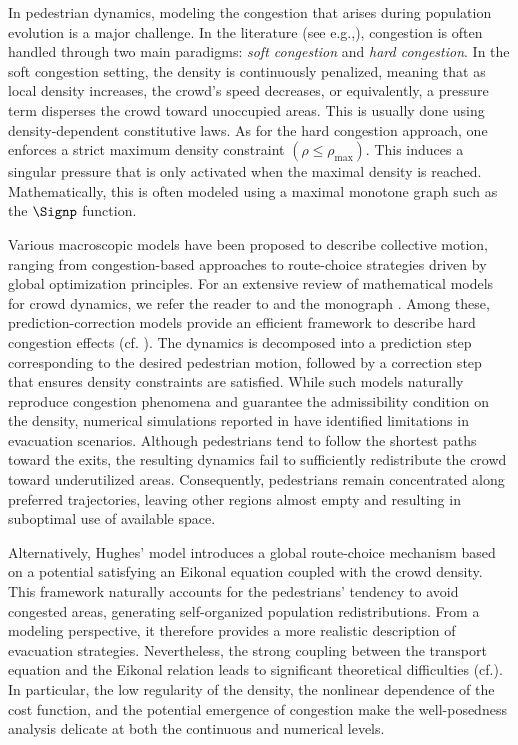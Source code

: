 \documentclass[final,reqno]{amsart}
\theoremstyle{plain}
\theoremstyle{definition}
\theoremstyle{remark}
\numberwithin{remark}{section}	%
\numberwithin{example}{section}	%
\newcommand{\cf}{cf.\xspace}	%
\newcommand{\eg}{e.g.,\xspace}	%
\begin{document}
In pedestrian dynamics, modeling the congestion that arises during population evolution is a major challenge. In the literature (see \eg \cite{Maury-EDP-Normandie}), congestion is often handled through two main paradigms: \emph{soft congestion} and \emph{hard congestion}. In the soft congestion setting, the density is continuously penalized, meaning that as local density increases, the crowd's speed decreases, or equivalently, a pressure term disperses the crowd toward unoccupied areas. This is usually done using density-dependent constitutive laws. As for the hard congestion approach, one enforces a strict maximum density constraint $(\rho \leq \rho_{\max})$. This induces a singular pressure that is only activated when the maximal density is reached. Mathematically, this is often modeled using a maximal monotone graph such as the $\Signp$ function.

Various macroscopic models have been proposed to describe collective motion, ranging from congestion-based approaches to route-choice strategies driven by global optimization principles. For an extensive review of mathematical models for crowd dynamics, we refer the reader to \cite{bellomo2011modeling} and the monograph \cite{cristiani2014multiscale}. Among these, prediction-correction models provide an efficient framework to describe hard congestion effects (cf. \cite{MRS1, MRSV, ennaji2023prediction, IgUrbano}). The dynamics is decomposed into a prediction step corresponding to the desired pedestrian motion, followed by a correction step that ensures density constraints are satisfied. While such models naturally reproduce congestion phenomena and guarantee the admissibility condition on the density, numerical simulations reported in \cite{ennaji2023prediction} have identified limitations in evacuation scenarios.  Although pedestrians tend to follow the shortest paths toward the exits, the resulting dynamics fail to sufficiently redistribute the crowd toward underutilized areas. Consequently, pedestrians remain concentrated along preferred trajectories, leaving other regions almost empty and resulting in suboptimal use of available space.

Alternatively, Hughes' model introduces a global route-choice mechanism based on a potential satisfying an Eikonal equation coupled with the crowd density. This framework naturally accounts for the pedestrians' tendency to avoid congested areas, generating self-organized population redistributions. From a modeling perspective, it therefore provides a more realistic description of evacuation strategies. Nevertheless, the strong coupling between the transport equation and the Eikonal relation leads to significant theoretical difficulties (\cf \cite{Amadori2023, Hughs2DSIM}). In particular, the low regularity of the density, the nonlinear dependence of the cost function, and the potential emergence of congestion make the well-posedness analysis delicate at both the continuous and numerical levels.
\end{document}
